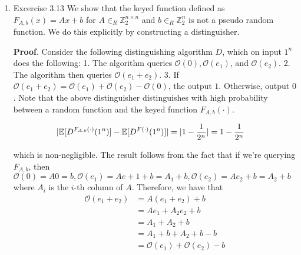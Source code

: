 \documentclass{article}
\begin{document}
\begin{enumerate}
\item{}
Excercise 3.13
We show that the keyed function defined as $F_{A,b}(x) = Ax + b$ for $A \in_R \mathbb{Z}_2^{n \times n}$ and
$b \in_R \mathbb{Z}_2^n$ is not a pseudo random function. We do this explicitly by constructing
a distinguisher.%

\begin{mdbmarginx}{1ex}{0pt}{1ex}{0pt}%
\noindent{}\textbf{Proof}.  Consider the following distinguishing algorithm $D$, which on input $1^n$ does the following:
1. The algorithm queries $\mathcal{O}(0), \mathcal{O}(e_1)$, and $\mathcal{O}(e_2)$.
2. The algorithm then queries $\mathcal{O}(e_1 + e_2)$. 
3. If $\mathcal{O}(e_1 + e_2) = \mathcal{O}(e_1) + \mathcal{O}(e_2) - \mathcal{O}(0)$, the output $1$. Otherwise, output $0$. 
Note that the above distinguisher distinguishes with high probability between a random function 
and the keyed function $F_{A,b}(\cdot)$.%
\end{mdbmarginx}%
\noindent\noindent\[%
\begin{aligned}
|\E[D^{F_{A,b}(\cdot)}(1^n)] - \E[D^{F(\cdot)}(1^n)]| &= |1 - \frac{1}{2^n}| = 1 - \frac{1}{2^n}
\end{aligned}
\]%

which is non-negligible. The result follows from the fact that if we're querying $F_{A,b}$, then
$\mathcal{O}(0) = A0 = b, \mathcal{O}(e_1) = Ae+1 + b = A_1 + b, \mathcal{O}(e_2) = Ae_2 + b = A_2 + b$ where 
$A_i$ is the $i$-th column of $A$. Therefore, we have that%
\noindent\noindent\[%
\begin{aligned}
\mathcal{O}(e_1 + e_2) &= A(e_1 + e_2) + b \\
&= Ae_1 + A_2e_2 + b \\
&= A_1 + A_2 + b \\
&= A_1 + b + A_2 + b - b \\
&= \mathcal{O}(e_1) + \mathcal{O}(e_2) - b
\end{aligned}
\]%


\end{enumerate}
\end{document}
